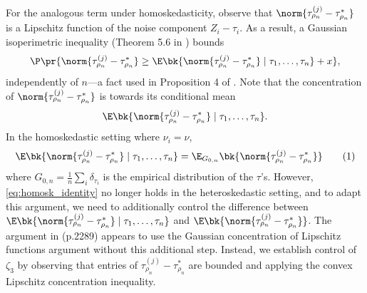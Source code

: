 \documentclass[12pt, reqno]{amsart}
\newcommand\numberthis{\addtocounter{equation}{1}\tag{\theequation}}
\numberwithin{equation}{section}
\begin{document}
\begin{refsection}
\begin{appendices}
\begin{rmksq}
For the analogous term under homoskedasticity, \citet{jiang2009general}  observe that $
\norm{\tau_ {\rho_n}^ {(j)} -
\tau_{\rho_n}^*}$ is a Lipschitz function of the noise component $Z_i - \tau_i$. As a result, a Gaussian
isoperimetric inequality
(Theorem 5.6 in \citet{boucheron2013concentration}) bounds \[
\P\pr{
  \norm{\tau_{\rho_n}^{(j)} - \tau_{\rho_n}^*} \ge \E\bk{ \norm{\tau_{\rho_n}^{(j)} -
  \tau_
  {\rho_n}^*} \mid \tau_1,\ldots, \tau_n } + x
},
\] independently of $n$---a fact used in Proposition 4 of \citet
 {jiang2009general}. Note that the concentration of $\norm{\tau_{\rho_n}^{(j)}
- \tau_{\rho_n}^*}$ is towards its conditional mean \[ \E\bk{ \norm{\tau_{\rho_n}^{(j)} -
  \tau_
  {\rho_n}^*} \mid \tau_1,\ldots, \tau_n }.\] In the homoskedastic setting where $\nu_i =
  \nu$, \[
 \E\bk{ \norm{\tau_{\rho_n}^{(j)} -
  \tau_
  {\rho_n}^*} \mid \tau_1,\ldots, \tau_n } = \E_{G_{0,n}} \bk{ \norm{\tau_{\rho_n}^{(j)} -
  \tau_
  {\rho_n}^*} } \numberthis \label{eq:homosk_identity}
  \]
  where $G_{0,n} = \frac{1}{n} \sum_i \delta_{\tau_i}$ is the empirical distribution of
  the $\tau$'s. However, \eqref{eq:homosk_identity} no longer holds in the heteroskedastic
  setting, and to adapt this argument, we need to additionally control the difference
  between $\E\bk{\norm{\tau_{\rho_n}^{(j)} -
  \tau_
  {\rho_n}^*} \mid \tau_1,\ldots, \tau_n }$ and $\E\bk{ \norm{\tau_{\rho_n}^{(j)} -
  \tau_
  {\rho_n}^*} }$. The argument in \citet{jiang2020general} (p.2289) appears to use the
  Gaussian concentration of Lipschitz functions argument without this additional step.
  Instead, we establish control of $\zeta_3$ by observing that entries of $\tau_{\rho_n}^{
  (j)} - \tau_{\rho_n}^*$ are bounded and applying the convex Lipschitz concentration
  inequality. 
\end{rmksq}



\end{appendices}
\end{refsection}
\end{document}

